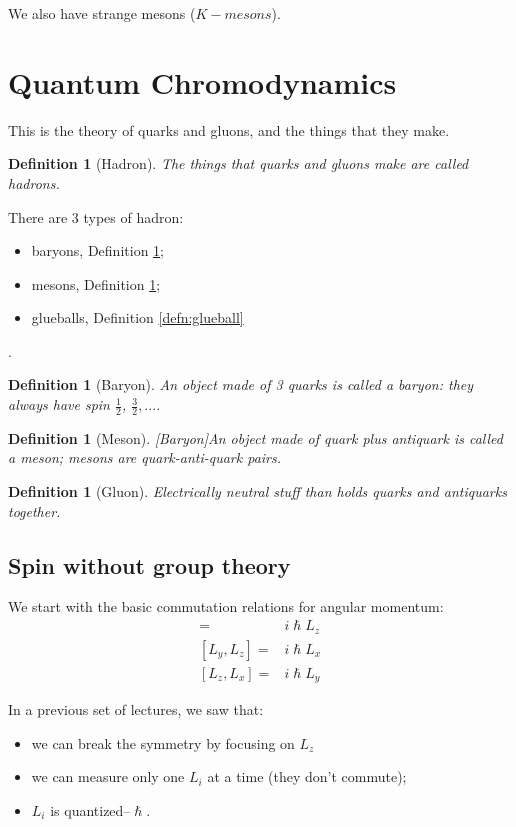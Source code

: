 \documentclass[]{article}
\newtheorem{defn}[thm]{Definition}
\begin{document}
We also have strange mesons ($K-mesons$).


\section{Quantum Chromodynamics}\label{section:qcd}

This is the theory of quarks and gluons, and the things that they make.

\begin{defn}[Hadron]
	The things that quarks and gluons make are called hadrons. 
\end{defn}

There are 3 types of hadron: \begin{itemize}
	\item baryons, Definition \ref{defn:baryon};
	\item mesons, Definition \ref{defn:meson};
	\item glueballs, Definition \ref{defn:glueball}
\end{itemize}.

\begin{defn}[Baryon]\label{defn:baryon}
	An object made of 3 quarks is called a baryon: they always have spin $\frac{1}{2}$, $\frac{3}{2},...$.
\end{defn}

\begin{defn}[Meson][Baryon]\label{defn:meson}
	An object made of quark plus antiquark is called a meson; mesons are quark-anti-quark pairs.
\end{defn}

\begin{defn}[Gluon]
	Electrically neutral stuff than holds quarks and antiquarks together.
\end{defn}

\subsection{Spin without group theory}
We start with the basic commutation relations for angular momentum:\cite[Particle Physics 1]{susskind2007theoretical}
\begin{align*}
	[L_x,L_y] =& i \hslash L_z\\
	[L_y,L_z] =& i \hslash L_x\\
	[L_z,L_x] =& i \hslash L_y
\end{align*}

In a previous set of lectures,  we saw that:

\begin{itemize}
	\item we can break the symmetry by focusing on $L_z$
	\item we can measure only one $L_i$ at a time (they don't commute);
	\item $L_i$ is quantized--$\hslash$.
\end{itemize}
\end{document}
